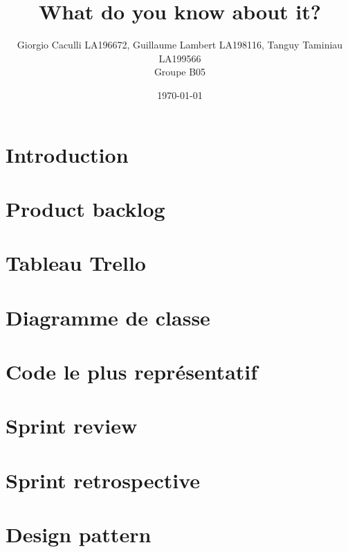 \documentclass[10pt]{article}
\title{What do you know about it?}
\author{Giorgio Caculli LA196672, Guillaume Lambert LA198116, Tanguy Taminiau LA199566 \\ Groupe B05}
\date{\today}
\begin{document}
\maketitle

\newpage
\tableofcontents

\newpage
\section*{Introduction}
\label{sec:intro}

\newpage
\section{Product backlog}


\newpage
\section{Tableau Trello}


\newpage
\section{Diagramme de classe}

\newpage
\section{Code le plus représentatif}


\newpage
\section{Sprint review}


\section{Sprint retrospective}


\section{Design pattern}


\newpage
\printglossary
\end{document}
